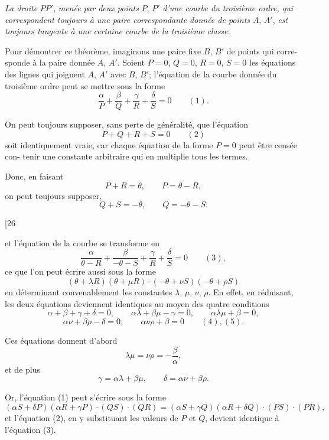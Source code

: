 \documentclass[11pt,a4paper]{article}
\begin{document}
\textit{La droite} $PP'$, \textit{men\'{e}e par deux points} $P$, $P'$ \textit{d'une courbe du troisi\`{e}me ordre, qui
correspondent toujours \`{a} une paire correspondante donn\'{e}e de points} $A$, $A'$, \textit{est toujours
tangente \`{a} une certaine courbe de la troisi\`{e}me classe.}

Pour d\'{e}montrer ce th\'{e}or\`{e}me, imaginons une paire fixe $B$, $B'$ de points qui corre-
sponde \`{a} la paire donn\'{e}e $A$, $A'$. Soient $P=0$, $Q=0$, $R=0$, $S=0$ les \'{e}quations des
lignes qui joignent $A$, $A'$ avec $B$, $B'$; l'\'{e}quation de la courbe donn\'{e}e du troisi\`{e}me ordre
peut se mettre sous la forme
\[
\frac{\alpha}{P} + \frac{\beta}{Q} + \frac{\gamma}{R} + \frac{\delta}{S} = 0 \qquad (1).
\]

On peut toujours supposer, sans perte de g\'{e}n\'{e}ralit\'{e}, que l'\'{e}quation
\[
P + Q + R + S = 0 \qquad (2)
\]
soit identiquement vraie, car chaque \'{e}quation de la forme $P=0$ peut \^{e}tre cens\'{e}e con-
tenir une constante arbitraire qui en multiplie tous les termes.

Donc, en faisant
\[
P + R = \theta, \qquad P = \theta - R,
\]
on peut toujours supposer,
\[
Q + S = -\theta, \qquad Q = -\theta - S.
\]

\newpage
\setcounter{page}{188}

\begin{center}
{\small [26}
\end{center}
\vspace{-1em}

et l'\'{e}quation de la courbe se transforme en
\[
\frac{\alpha}{\theta - R} + \frac{\beta}{-\theta - S} + \frac{\gamma}{R} + \frac{\delta}{S} = 0 \qquad (3),
\]
ce que l'on peut \'{e}crire aussi sous la forme
\[
(\theta + \lambda R)(\theta + \mu R) \cdot (-\theta + \nu S)(-\theta + \rho S)
\]
en d\'{e}terminant convenablement les constantes $\lambda$, $\mu$, $\nu$, $\rho$. En effet, en r\'{e}duisant, les
deux \'{e}quations deviennent identiques au moyen des quatre conditions
\[
\alpha + \beta + \gamma + \delta = 0, \qquad \alpha\lambda + \beta\mu - \gamma = 0, \qquad \alpha\lambda\mu + \beta = 0,
\]
\[
\alpha\nu + \beta\rho - \delta = 0, \qquad \alpha\nu\rho + \beta = 0 \qquad (4), (5).
\]

Ces \'{e}quations donnent d'abord
\[
\lambda\mu = \nu\rho = -\frac{\beta}{\alpha},
\]
et de plus
\[
\gamma = \alpha\lambda + \beta\mu, \qquad \delta = \alpha\nu + \beta\rho.
\]

Or, l'\'{e}quation (1) peut s'\'{e}crire sous la forme
\[
(\alpha S + \delta P)(\alpha R + \gamma P) \cdot (QS) \cdot (QR) = (\alpha S + \gamma Q)(\alpha R + \delta Q) \cdot (PS) \cdot (PR),
\]
et l'\'{e}quation (2), en y substituant les valeurs de $P$ et $Q$, devient identique \`{a} l'\'{e}quation (3).
\end{document}
